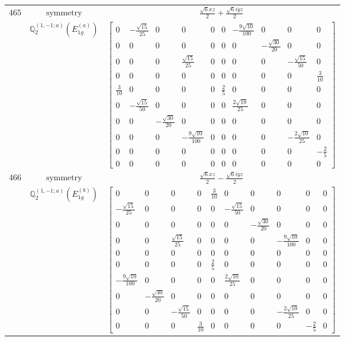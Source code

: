 \documentclass[fleqn,8pt,landscape]{jsarticle}
\begin{document}
\begin{longtable}{ccc}
$ 465 $ & $ \text{symmetry} $ & $ \frac{\sqrt{6} x z}{2} + \frac{\sqrt{6} i y z}{2} $ \\
$  $ & $ \mathbb{Q}_{2}^{(1,-1;a)}(E_{1g}^{(a)}) $ & $ \begin{bmatrix} 0 & - \frac{\sqrt{15}}{25} & 0 & 0 & 0 & 0 & - \frac{9 \sqrt{10}}{100} & 0 & 0 & 0 \\ 0 & 0 & 0 & 0 & 0 & 0 & 0 & - \frac{\sqrt{30}}{20} & 0 & 0 \\ 0 & 0 & 0 & \frac{\sqrt{15}}{25} & 0 & 0 & 0 & 0 & - \frac{\sqrt{15}}{50} & 0 \\ 0 & 0 & 0 & 0 & 0 & 0 & 0 & 0 & 0 & \frac{3}{10} \\ \frac{3}{10} & 0 & 0 & 0 & 0 & \frac{2}{5} & 0 & 0 & 0 & 0 \\ 0 & - \frac{\sqrt{15}}{50} & 0 & 0 & 0 & 0 & \frac{2 \sqrt{10}}{25} & 0 & 0 & 0 \\ 0 & 0 & - \frac{\sqrt{30}}{20} & 0 & 0 & 0 & 0 & 0 & 0 & 0 \\ 0 & 0 & 0 & - \frac{9 \sqrt{10}}{100} & 0 & 0 & 0 & 0 & - \frac{2 \sqrt{10}}{25} & 0 \\ 0 & 0 & 0 & 0 & 0 & 0 & 0 & 0 & 0 & - \frac{2}{5} \\ 0 & 0 & 0 & 0 & 0 & 0 & 0 & 0 & 0 & 0 \end{bmatrix} $ \\ \hline
$ 466 $ & $ \text{symmetry} $ & $ \frac{\sqrt{6} x z}{2} - \frac{\sqrt{6} i y z}{2} $ \\
$  $ & $ \mathbb{Q}_{2}^{(1,-1;a)}(E_{1g}^{(b)}) $ & $ \begin{bmatrix} 0 & 0 & 0 & 0 & \frac{3}{10} & 0 & 0 & 0 & 0 & 0 \\ - \frac{\sqrt{15}}{25} & 0 & 0 & 0 & 0 & - \frac{\sqrt{15}}{50} & 0 & 0 & 0 & 0 \\ 0 & 0 & 0 & 0 & 0 & 0 & - \frac{\sqrt{30}}{20} & 0 & 0 & 0 \\ 0 & 0 & \frac{\sqrt{15}}{25} & 0 & 0 & 0 & 0 & - \frac{9 \sqrt{10}}{100} & 0 & 0 \\ 0 & 0 & 0 & 0 & 0 & 0 & 0 & 0 & 0 & 0 \\ 0 & 0 & 0 & 0 & \frac{2}{5} & 0 & 0 & 0 & 0 & 0 \\ - \frac{9 \sqrt{10}}{100} & 0 & 0 & 0 & 0 & \frac{2 \sqrt{10}}{25} & 0 & 0 & 0 & 0 \\ 0 & - \frac{\sqrt{30}}{20} & 0 & 0 & 0 & 0 & 0 & 0 & 0 & 0 \\ 0 & 0 & - \frac{\sqrt{15}}{50} & 0 & 0 & 0 & 0 & - \frac{2 \sqrt{10}}{25} & 0 & 0 \\ 0 & 0 & 0 & \frac{3}{10} & 0 & 0 & 0 & 0 & - \frac{2}{5} & 0 \end{bmatrix} $ \\ \hline

\end{longtable}
\end{document}

